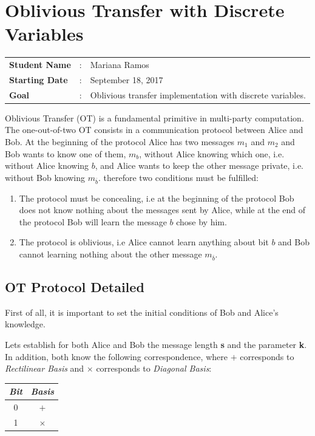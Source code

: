 \clearpage
\section{Oblivious Transfer with Discrete Variables}

\begin{tcolorbox}	
\begin{tabular}{p{2.75cm} p{0.2cm} p{10.5cm}} 	
\textbf{Student Name}  &:& Mariana Ramos\\
\textbf{Starting Date} &:& September 18, 2017\\
\textbf{Goal}          &:& Oblivious transfer implementation with discrete variables.
\end{tabular}
\end{tcolorbox}

Oblivious Transfer (OT) is a fundamental primitive in multi-party computation. The one-out-of-two OT consists in a communication protocol between Alice and Bob. At the beginning of the protocol Alice has two messages $m_1$ and $m_2$ and Bob wants to know one of them, $m_b$, without Alice knowing which one, i.e. without Alice knowing $b$, and Alice wants to keep the other message private, i.e. without Bob knowing $m_{\bar{b}}$. therefore two conditions must be fulfilled:
\begin{enumerate}
	\item{The protocol must be concealing, i.e at the beginning of the protocol Bob does not know nothing about the messages sent by Alice, while at the end of the protocol Bob will learn the message $b$ chose by him.}
	\item{The protocol is oblivious, i.e Alice cannot learn anything about bit $b$ and Bob cannot learning nothing about the other message $m_{\bar{b}}$.}
\end {enumerate}

\subsection{OT Protocol Detailed}

 First of all, it is important to set the initial conditions of Bob and Alice's knowledge.

Lets establish for both Alice and Bob the message length \textbf{s} and the parameter \textbf{k}. In addition, both know the following correspondence, where $+$ corresponds to \textit{Rectilinear Basis} and $\times$ corresponds to \textit{Diagonal Basis}:

\begin{table}[H]
\centering
\begin{tabular}{c|c}
\textbf{\textit{Bit}}         & \textbf{\textit{Basis}} \\ \hline
 0 & $+$ \\
 1 & $\times$ \\
\end{tabular}
\end{table}

